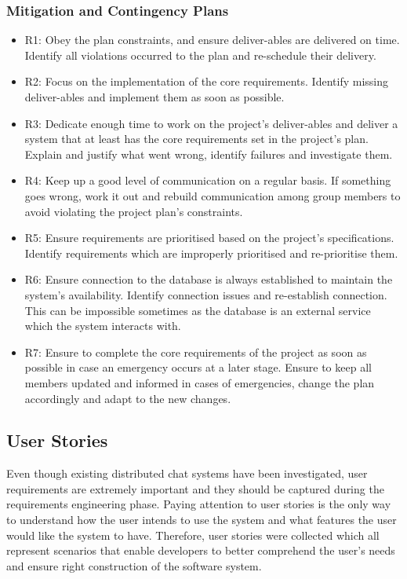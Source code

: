 \documentclass{article}
\begin{document}
\subsubsection{Mitigation and Contingency Plans}
\begin{itemize}
\item R1: Obey the plan constraints, and ensure deliver-ables are delivered on time. \newline 
Identify all violations occurred to the plan and re-schedule their delivery.
\item R2: Focus on the implementation of the core requirements. \newline
Identify missing deliver-ables and implement them as soon as possible. 
\item R3: Dedicate enough time to work on the project’s deliver-ables and deliver a system that at least has the core requirements set in the project's plan. \newline
Explain and justify what went wrong, identify failures and investigate them. 
\item R4: Keep up a good level of communication on a regular basis. \newline
If something goes wrong, work it out and rebuild communication among group members to avoid violating the project plan's constraints. 
\item R5: Ensure requirements are prioritised based on the project’s specifications. \newline
Identify requirements which are improperly prioritised and re-prioritise them. 
\item R6: Ensure connection to the database is always established to maintain the system's availability. \newline
Identify connection issues and re-establish connection. This can be impossible sometimes as the database is an external service which the system interacts with. 
\item R7: Ensure to complete the core requirements of the project as soon as possible in case an emergency occurs at a later stage. \newline
Ensure to keep all members updated and informed in cases of emergencies, change the plan accordingly and adapt to the new changes. 
\end{itemize}

\subsection{User Stories}
Even though existing distributed chat systems have been investigated, user requirements are extremely important and they should be captured during the requirements engineering phase. Paying attention to user stories is the only way to understand how the user intends to use the system and what features the user would like the system to have. Therefore, user stories were collected which all represent scenarios that enable developers to better comprehend the user’s needs and ensure right construction of the software system. \par
\end{document}
